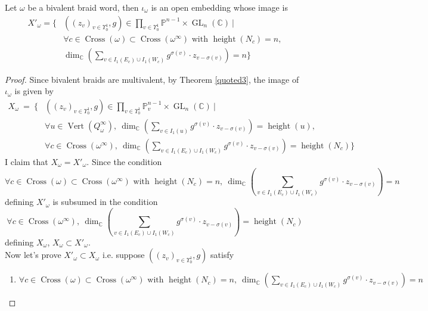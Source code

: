 \begin{theorem}
	Let $\omega$ be a bivalent braid word, then $\iota_\omega$ is an open embedding whose image is 
\begin{align*}
X'_\omega =\{ &((z_v)_{v\in\Upsilon_0^1},g)\in \prod_{v\in \Upsilon_0^1} \mathbb{P}^{n-1} \times \operatorname{GL}_n(\mathbb{C})~|\\
&\forall c\in \operatorname{Cross}(\omega)\subset \operatorname{Cross}(\omega^\infty)\text{ with } \operatorname{height}(N_c)=n,\\
& \operatorname{dim}_\mathbb{C}(\sum_{v\in I_1(E_c)\cup I_1(W_c)}g^{\sigma(v)}\cdot z_{v-\sigma(v)}) = n\}
\end{align*}
\end{theorem}
\begin{proof}
Since bivalent braids are multivalent, by Theorem \ref{quoted3}, the image of $\iota_\omega$ is given by 
\begin{align*}
X_\omega~=~\{ &((z_v)_{v\in \Upsilon_0^1},g)\in \prod_{v\in\Upsilon_0^1}\mathbb{P}_v^{n-1}\times \operatorname{GL}_n(\mathbb{C})~|\\
& \forall u\in \operatorname{Vert}(Q_\omega^\infty),~\operatorname{dim}_\mathbb{C}(\sum_{v\in I_1(u)} g^{\sigma(v)}\cdot z_{v-\sigma(v)}) = \operatorname{height}(u),\\
& \forall c\in \operatorname{Cross}(\omega^\infty),~\operatorname{dim}_\mathbb{C}(\sum_{v\in I_1(E_c)\cup I_1(W_c)} g^{\sigma(v)}\cdot z_{v-\sigma(v)}) = \operatorname{height}(N_c)\}
\end{align*}
I claim that $X_\omega = X'_\omega$. Since the condition
\[
\forall c\in \operatorname{Cross}(\omega)\subset \operatorname{Cross}(\omega^\infty)\text{ with } \operatorname{height}(N_c)=n, ~ \operatorname{dim}_\mathbb{C}(\sum_{v\in I_1(E_c)\cup I_1(W_c)}g^{\sigma(v)}\cdot z_{v-\sigma(v)}) = n
\]
defining $X'_\omega$ is subsumed in the condition
\[
\forall c\in \operatorname{Cross}(\omega^\infty),~\operatorname{dim}_\mathbb{C}(\sum_{v\in I_1(E_c)\cup I_1(W_c)} g^{\sigma(v)}\cdot z_{v-\sigma(v)}) = \operatorname{height}(N_c)
\]
defining $X_\omega$, $X_\omega \subset X'_\omega$.\\
Now let's prove $X'_\omega \subset X_\omega$ i.e. suppose $((z_v)_{v\in \Upsilon_0^1},g)$ satisfy
\begin{enumerate}[label = (\roman*)]
\item $\forall c\in \operatorname{Cross}(\omega)\subset \operatorname{Cross}(\omega^\infty)\text{ with } \operatorname{height}(N_c)=n, ~ \operatorname{dim}_\mathbb{C}(\sum_{v\in I_1(E_c)\cup I_1(W_c)}g^{\sigma(v)}\cdot z_{v-\sigma(v)}) = n$\\

\end{enumerate}
\end{proof}
